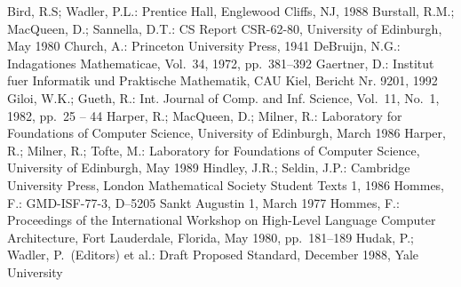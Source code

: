 {\begin{thebibliography}{AAAA}
%
Bird, R.S; Wadler, P.L.:
\bmt
{}
\amt
Prentice Hall, Englewood Cliffs, NJ, 1988
%
Burstall, R.M.; MacQueen, D.; Sannella, D.T.:
\bmt
{}
\amt
CS Report CSR-62-80, University of Edinburgh, May 1980
%
Church, A.:
\bmt
{}
\amt
Princeton University Press, 1941
%
DeBruijn, N.G.:
\bmt
{}
\amt
Indagationes Mathematicae, Vol.~34, 1972,
pp.~381--392
%
Gaertner, D.:
\bmt
{}
\amt
Institut fuer Informatik und Praktische Mathematik, CAU Kiel,
Bericht Nr. 9201, 1992
%
Giloi, W.K.; Gueth, R.:
\bmt
{}
\amt
Int. Journal of Comp. and Inf. Science, Vol.~11, No.~1, 1982, pp.~25 -- 44
%
Harper, R.; MacQueen, D.; Milner, R.:
\bmt
{}
\amt
Laboratory for Foundations of Computer Science,
University of Edinburgh,
March 1986
%
Harper, R.; Milner, R.; Tofte, M.:
\bmt
{}
\amt
Laboratory for Foundations of Computer Science,
University of Edinburgh,
May 1989 
%
%
Hindley, J.R.; Seldin, J.P.:
\bmt
{}
\amt
Cambridge University Press, London Mathematical
Society Student Texts 1, 1986
%
Hommes, F.:
\bmt
{}
\amt
GMD-ISF-77-3, D--5205 Sankt Augustin 1, March 1977
%
Hommes, F.:
\bmt
{}
\amt
Proceedings of the International Workshop on High-Level
Language Computer Architecture, Fort Lauderdale, Florida, May 1980,
pp.~181--189
%
Hudak, P.; Wadler, P.\ (Editors) et al.:
\bmt
{}
\amt
Draft Proposed Standard, December 1988, Yale University

\end{thebibliography}}
